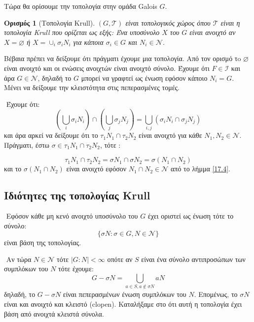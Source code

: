 \documentclass[oneside,a4paper]{article}
\newtheorem*{defn}{Ορισμός}
\newcommand {\tl}{\textlatin}
\begin{document}
\noindent Τώρα θα ορίσουμε την τοπολογία στην ομάδα \tl{Galois} $G$.

\begin{defn}[Τοπολογία \tl{Krull}] $(G,\mathcal{T})$ είναι τοπολογικός χώρος όπου $\mathcal{T}$ είναι η τοπολογία \tl{Krull} που ορίζεται ως εξής:
Ένα υποσύνολο $X$ του $G$ είναι ανοιχτό αν $X=\varnothing$ ή $X= \cup_i \sigma_i N_i$ για κάποια $\sigma_i \in G$ και $N_i \in \mathcal{N}$.
\end{defn}

\noindent Βέβαια πρέπει να δείξουμε ότι πράγματι έχουμε μια τοπολογία. Από τον ορισμό τo $\varnothing$ είναι ανοιχτό και οι ενώσεις ανοιχτών είναι ανοιχτό σύνολο. Έχουμε ότι $F \in \mathcal{I}$ και άρα $G \in \mathcal{N}$, δηλαδή το $G$ μπορεί να γραφτεί ως ένωση εφόσον κάποιο $N_i = G$. Μένει να δείξουμε την κλειστότητα στις πεπερασμένες τομές.

$ $\newline
Έχουμε ότι: 
$$\left(\bigcup_i \sigma_i N_i \right) \cap \left(\bigcup_j \sigma_j N_j \right) = \bigcup_{i, j} \left( \sigma_i N_i \cap \sigma_j N_j \right)$$
και άρα αρκεί να δείξουμε ότι το $\tau_1 N_1 \cap \tau_2 N_2$ είναι ανοιχτό για κάθε $N_1, N_2 \in \mathcal{N}$. Πράγματι, έστω $\sigma \in \tau_1 N_1 \cap \tau_2 N_2$, τότε :

$$\tau_1 N_1 \cap \tau_2 N_2 = \sigma N_1 \cap \sigma N_2 = \sigma (N_1 \cap N_2)$$
και το $\sigma (N_1 \cap N_2)$ είναι ανοιχτό εφόσον $N_1 \cap N_2 \in \mathcal{N}$ από το λήμμα \ref{17.4}.

\subsection{Ιδιότητες της τοπολογίας \tl{Krull}}

$ $\newline
\noindent Εφόσον κάθε μη κενό ανοιχτό υποσύνολο του $G$ έχει οριστεί ως ένωση τότε το σύνολο:
$$\{\sigma N : \sigma \in G , N \in \mathcal{N} \}$$
είναι βάση της τοπολογίας.

$ $\newline
\noindent Αν τώρα $N \in \mathcal{N}$ τότε $|G:N|<\infty$ οπότε αν $S$ είναι ένα σύνολο αντιπροσώπων των συμπλόκων του $N$ τότε έχουμε:
$$G-\sigma N = \bigcup\limits_{a\in S, a\not\in \sigma N} aN$$
δηλαδή, το $G-\sigma N$ είναι πεπερασμένων ένωση συμπλόκων του $N$. Επομένως, το $\sigma N$ είναι και ανοιχτό και κλειστό (\tl{clopen}).
Καταλήξαμε στο ότι αυτή η τοπολογία έχει βάση από ανοιχτά κλειστά σύνολα.
\end{document}
